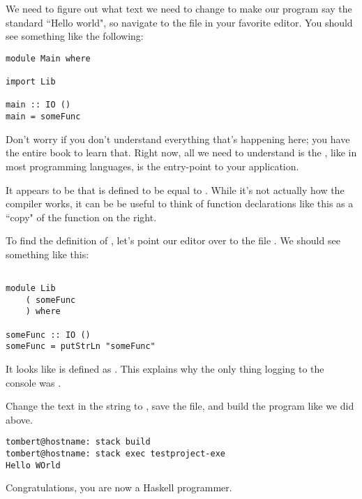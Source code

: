 We need to figure out what text we need to change to make our program say the standard ``Hello world", so navigate to the  file in your favorite editor. You should see something like the following: 

\begin{verbatim}
module Main where

import Lib

main :: IO ()
main = someFunc
\end{verbatim}

Don't worry if you don't understand everything that's happening here; you have the entire book to learn that.  Right now, all we need to understand is the , like in most programming languages, is the entry-point to your application. 

It appears to be that  is defined to be equal to .  While it's not actually how the compiler works, it can be be useful to think of function declarations like this as a ``copy"  of the function on the right. 

To find the definition of , let's point our editor over to the file .  We should see something like this: 

\begin{verbatim}

module Lib
    ( someFunc
    ) where

someFunc :: IO ()
someFunc = putStrLn "someFunc"

\end{verbatim}

It looks like  is defined as .  This explains why the only thing logging to the console was .  

Change the text in the string to , save the file, and build the program like we did above.  

\begin{verbatim}
tombert@hostname: stack build
tombert@hostname: stack exec testproject-exe
Hello WOrld
\end{verbatim}

Congratulations, you are now a Haskell programmer.  
